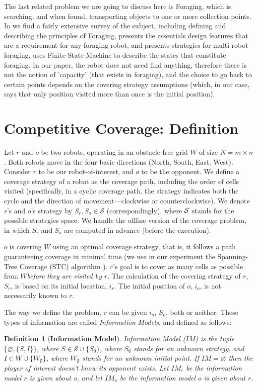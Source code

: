 \documentclass[a4paper,english,10pt]{article}
\newcommand\rob{\ensuremath{r}\xspace}
\newcommand\opp{\ensuremath{o}\xspace}
\newcommand{\w}{\ensuremath{W}\xspace}
\newtheorem{definition}{Definition}
\begin{document}
The last related problem we are going to discuss here is Foraging, which is searching, and when found, transporting objects to one or more collection points. In \cite{winfield2009foraging} we find a fairly extensive survey of the subject, including defining and describing the principles of Foraging, presents the essentials design features that are a requirement for any foraging robot, and presents strategies for multi-robot foraging. \cite{winfield2009foraging} uses Finite-State-Machine to describe the states that constitute foraging. In our paper, the robot does not need find anything, therefore there is not the notion of 'capacity' (that exists in foraging), and the choice to go back to certain points depends on the covering strategy assumptions (which, in our case, says that only position visited more than once is the initial position).


\section{Competitive Coverage: Definition}
Let \rob and \opp be two robots, operating in an obstacle-free grid \w of size $N=m \times n$. Both robots move in the four basic directions (North, South, East, West). Consider \rob to be our robot-of-interest, and \opp to be the opponent. 
We define a coverage strategy of a robot as the coverage path, including the order of cells visited (specifically, in a cyclic coverage path, the strategy indicates both the cycle and the direction of movement---clockwise or counterclockwise). We denote \rob's and \opp's strategy by $S_\rob,S_\opp\in \mathcal{S}$ (correspondingly), where $\cal{S}$ stands for the possible strategies space. We handle the offline version of the coverage problem, in which $S_\rob$ and $S_\opp$ are computed in advance (before the execution). 

\opp is covering \w using an optimal coverage strategy, that is, it follows a path guaranteeing coverage in minimal time (we use in our experiment the Spanning-Tree Coverage (STC) algorithm \cite{gabriely2001spanning}). \rob's goal is to cover as many cells as possible from \w {\em before they are visited by \rob}. The calculation of the covering strategy of \rob, $S_\rob$, is based on its initial location, $i_r$. The initial position of \opp, $i_\opp$, is not necessarily known to \rob.

The way we define the problem, \rob can be given $i_\opp$, $S_\opp$, both or neither. These types of information are called {\em Information Models}, and defined as follows:
\begin{definition}[\textbf{Information Model}]
Information Model ($IM$) is the tuple $\lbrace \varnothing, \lbrace S,I\rbrace \rbrace$, where $S\in \mathcal{S} \cup \lbrace S_\emptyset \rbrace$, where $S_\emptyset$ stands for an unknown strategy, and $I \in W \cup \lbrace \w_\emptyset \rbrace$, where $\w_{\emptyset}$ stands for an unknown initial point. 
If $IM=\varnothing$ then the player of interest doesn't know its opponent exists.
Let $IM_\rob$ be the information model \rob is given about \opp, and let $IM_\opp$ be the information model \opp is given about \rob.
\end{definition}
\end{document}

